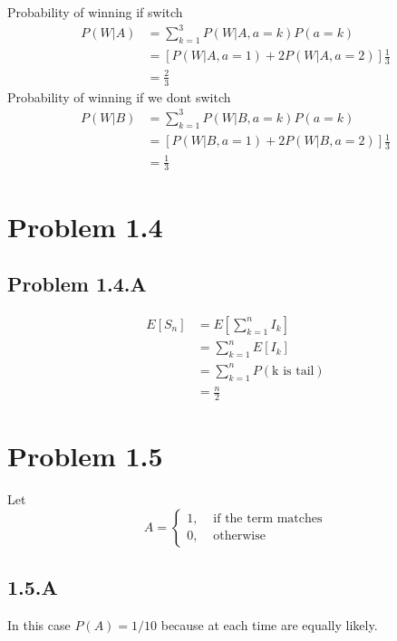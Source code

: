\documentclass[12pt, a4paper]{article}
\begin{document}
Probability of winning if switch
\begin{subequations}
  \begin{align}
    P(W|A) &= \sum_{k=1}^3 P(W|A,a=k)P(a=k)\\
           &= [P(W|A,a=1) + 2P(W|A,a=2)]\frac{1}{3}\\
           &= \frac{2}{3}
  \end{align}
\end{subequations}
Probability of winning if we dont switch
\begin{subequations}
  \begin{align}
    P(W|B) &= \sum_{k=1}^3 P(W|B,a=k)P(a=k)\\
           &= [P(W|B,a=1) + 2P(W|B,a=2)]\frac{1}{3}\\
           &= \frac{1}{3}
  \end{align}
\end{subequations}

\section{Problem 1.4}
\subsection{Problem 1.4.A}
\begin{subequations}
  \begin{align}
    E[S_n] &= E[\sum_{k=1}^nI_k]\\
           &= \sum_{k=1}^n E[I_k]\\
           &= \sum_{k=1}^n P(\text{k is tail})\\
           &= \frac{n}{2}
  \end{align}
\end{subequations}

\section{Problem 1.5}
Let 
\[
  A = \begin{cases}
      1, & \text{ if the term matches}\\
      0, & \text{ otherwise }
      \end{cases}
\]
\subsection{1.5.A}
In this case $P(A) = 1/10$ because at each time are equally likely.
\end{document}
